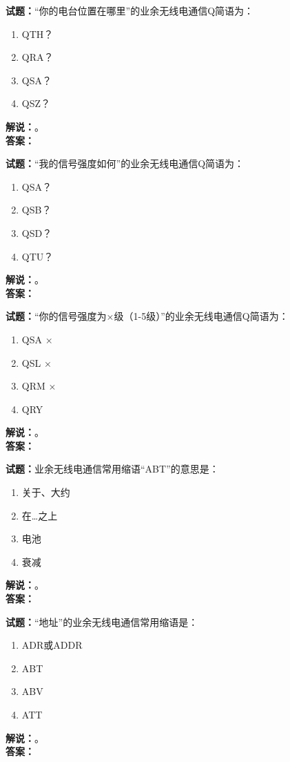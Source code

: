 \documentclass{ctexbook}
\begin{document}
\bigskip

\noindent\textbf{试题：}“你的电台位置在哪里”的业余无线电通信Q简语为：
\begin{enumerate}[leftmargin=3em]
  \item QTH？
  \item QRA？
  \item QSA？
  \item QSZ？
\end{enumerate}
\noindent\textbf{解说：}\textbf{}。\\\noindent\textbf{答案：}

\bigskip

\noindent\textbf{试题：}“我的信号强度如何”的业余无线电通信Q简语为：
\begin{enumerate}[leftmargin=3em]
  \item QSA？
  \item QSB？
  \item QSD？
  \item QTU？
\end{enumerate}
\noindent\textbf{解说：}\textbf{}。\\\noindent\textbf{答案：}

\bigskip

\noindent\textbf{试题：}“你的信号强度为×级（1-5级）”的业余无线电通信Q简语为：
\begin{enumerate}[leftmargin=3em]
  \item QSA ×
  \item QSL ×
  \item QRM ×
  \item QRY
\end{enumerate}
\noindent\textbf{解说：}\textbf{}。\\\noindent\textbf{答案：}

\bigskip

\noindent\textbf{试题：}业余无线电通信常用缩语“ABT”的意思是：
\begin{enumerate}[leftmargin=3em]
  \item 关于、大约
  \item 在…之上
  \item 电池
  \item 衰减
\end{enumerate}
\noindent\textbf{解说：}\textbf{}。\\\noindent\textbf{答案：}

\bigskip

\noindent\textbf{试题：}“地址”的业余无线电通信常用缩语是：
\begin{enumerate}[leftmargin=3em]
  \item ADR或ADDR
  \item ABT
  \item ABV
  \item ATT
\end{enumerate}
\noindent\textbf{解说：}\textbf{}。\\\noindent\textbf{答案：}
\end{document}
